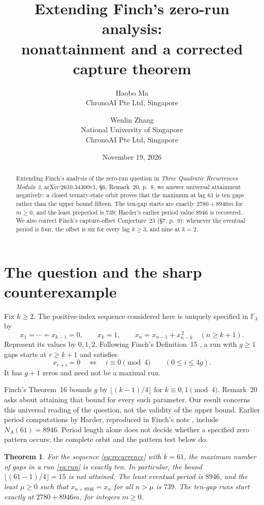 \documentclass[11pt]{article}
\title{Extending Finch's zero-run analysis:\\nonattainment and a corrected capture theorem}
\author{Haobo Ma\\\small ChronoAI Pte Ltd, Singapore
\and Wenlin Zhang\\\small National University of Singapore\\\small ChronoAI Pte Ltd, Singapore}
\date{November 19, 2026}
\newtheorem{theorem}{Theorem}
\newcommand{\F}{\mathbb F_3}
\begin{document}
\maketitle
\begin{abstract}
Extending Finch's analysis of the zero-run question in \emph{Three
Quadratic Recurrences Modulo 3}, arXiv:2610.34300v1, \S6, Remark~20,
p.~8, we answer universal attainment negatively: a closed ternary-state
orbit proves that the maximum at lag $61$ is ten gaps rather than the
upper bound fifteen. The ten-gap starts are exactly $2780+8946m$
for $m\ge0$, and the least preperiod is $739$; Harder's earlier period
value $8946$ is recovered. We also correct Finch's capture-offset
Conjecture~23 (\S7, p.~9): whenever the eventual period is four,
the offset is six for every lag $k\ge3$, and nine at $k=2$.
\end{abstract}

\section{The question and the sharp counterexample}
Fix $k\ge2$. The positive-index sequence considered here is uniquely
specified in $\F$ by
\begin{equation}\label{eq:recurrence}
 x_1=\cdots=x_{k-1}=0,\qquad x_k=1,\qquad
 x_n=x_{n-1}+x_{n-k}^{\,2}\quad(n\ge k+1).
\end{equation}
Represent its values by $0,1,2$. Following Finch's Definition~15
\cite[\S6, pp.~6--7]{finch2026}, a run with $g\ge1$ gaps starts at
$r\ge k+1$ and satisfies
\begin{equation}\label{eq:run}
 x_{r+i}=0\quad\Longleftrightarrow\quad i\equiv0\pmod4
 \qquad(0\le i\le4g).
\end{equation}
It has $g+1$ zeros and need not be a maximal run.

Finch's Theorem~16 bounds $g$ by $\lfloor(k-1)/4\rfloor$ for
$k\equiv0,1\pmod4$. Remark~20 asks about attaining that bound
for every such parameter. Our result concerns this universal reading
of the question, not the validity of the upper bound. Earlier period
computations by Harder, reproduced in Finch's note
\cite[\S0.2, p.~2]{finch2002}, include $N_A(61)=8946$.
Period length alone does not decide whether a specified zero pattern occurs;
the complete orbit and the pattern test below do.

\begin{theorem}\label{thm:main}
For the sequence \eqref{eq:recurrence} with $k=61$, the maximum number
of gaps in a run \eqref{eq:run} is exactly ten. In particular, the
bound $\lfloor(61-1)/4\rfloor=15$ is not attained. The least eventual
period is $8946$, and the least $\mu\ge0$ such that
$x_{n+8946}=x_n$ for all $n>\mu$ is $739$.
The ten-gap runs start exactly at $2780+8946m$, for integers $m\ge0$.
\end{theorem}
\end{document}
